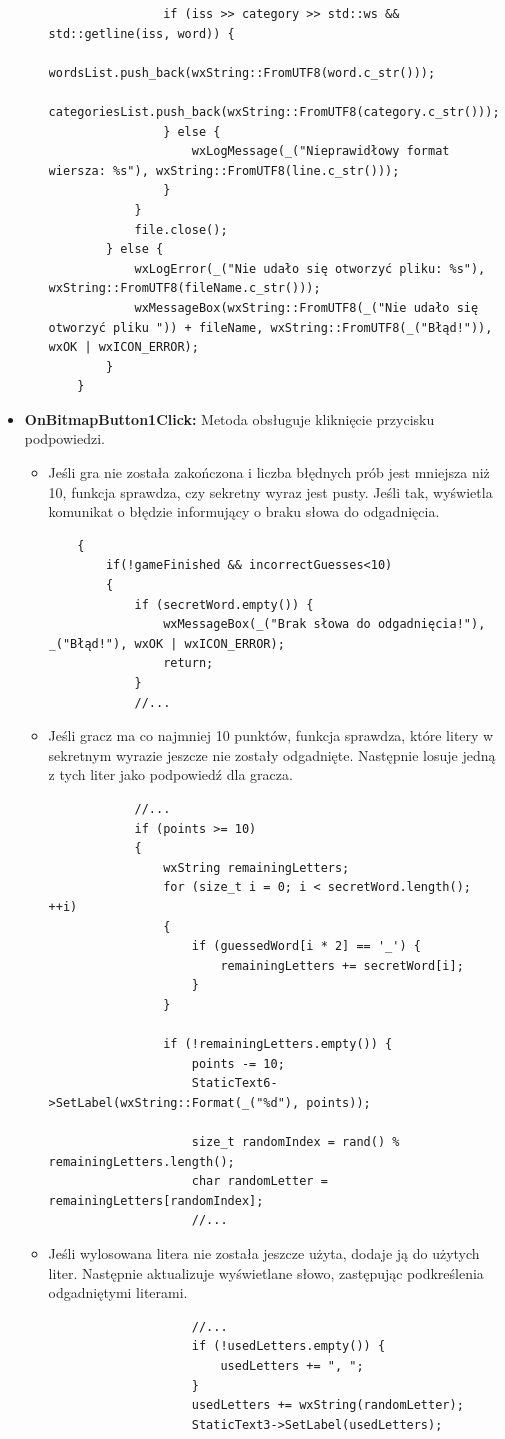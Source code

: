 \documentclass[]{report}
\begin{document}
\begin{itemize}
\begin{itemize}
\begin{lstlisting}
				if (iss >> category >> std::ws && std::getline(iss, word)) {
					wordsList.push_back(wxString::FromUTF8(word.c_str()));
					categoriesList.push_back(wxString::FromUTF8(category.c_str()));
				} else {
					wxLogMessage(_("Nieprawidłowy format wiersza: %s"), wxString::FromUTF8(line.c_str()));
				}
			}
			file.close();
		} else {
			wxLogError(_("Nie udało się otworzyć pliku: %s"), wxString::FromUTF8(fileName.c_str()));
			wxMessageBox(wxString::FromUTF8(_("Nie udało się otworzyć pliku ")) + fileName, wxString::FromUTF8(_("Błąd!")), wxOK | wxICON_ERROR);
		}
	}
			\end{lstlisting}
		\end{itemize}
		\item \textbf{OnBitmapButton1Click:} Metoda obsługuje kliknięcie przycisku podpowiedzi.
		\begin{itemize}
			\item Jeśli gra nie została zakończona i liczba błędnych prób jest mniejsza niż 10, funkcja sprawdza, czy sekretny wyraz jest pusty. Jeśli tak, wyświetla komunikat o błędzie informujący o braku słowa do odgadnięcia.
			\begin{lstlisting}
	{
		if(!gameFinished && incorrectGuesses<10)
		{
			if (secretWord.empty()) {
				wxMessageBox(_("Brak słowa do odgadnięcia!"), _("Błąd!"), wxOK | wxICON_ERROR);
				return;
			}
			//...
			\end{lstlisting}
	\newpage
			\item Jeśli gracz ma co najmniej 10 punktów, funkcja sprawdza, które litery w sekretnym wyrazie jeszcze nie zostały odgadnięte. Następnie losuje jedną z tych liter jako podpowiedź dla gracza.
			\begin{lstlisting}
			//...
			if (points >= 10)
			{
				wxString remainingLetters;
				for (size_t i = 0; i < secretWord.length(); ++i)
				{
					if (guessedWord[i * 2] == '_') {
						remainingLetters += secretWord[i];
					}
				}
				
				if (!remainingLetters.empty()) {
					points -= 10;
					StaticText6->SetLabel(wxString::Format(_("%d"), points));
					
					size_t randomIndex = rand() % remainingLetters.length();
					char randomLetter = remainingLetters[randomIndex];
					//...
			\end{lstlisting}
			\item Jeśli wylosowana litera nie została jeszcze użyta, dodaje ją do użytych liter. Następnie aktualizuje wyświetlane słowo, zastępując podkreślenia odgadniętymi literami.
			\begin{lstlisting}
					//...
					if (!usedLetters.empty()) {
						usedLetters += ", ";
					}
					usedLetters += wxString(randomLetter);
					StaticText3->SetLabel(usedLetters);
					

\end{lstlisting}
\end{itemize}
\end{itemize}
\end{document}

